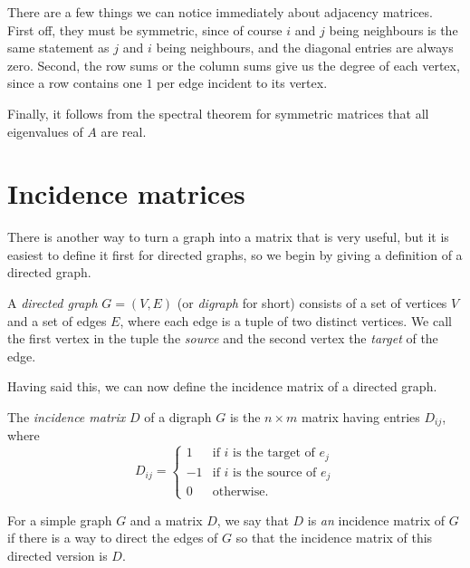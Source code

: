 \documentclass[nobib]{tufte-handout}
\begin{document}
\begin{remark}
    There are a few things we can notice immediately about adjacency matrices. First off, they must be symmetric, since of course $i$ and $j$ being neighbours is the same statement as $j$ and $i$ being neighbours, and the diagonal entries are always zero. Second, the row sums or the column sums give us the degree of each vertex, since a row contains one $1$ per edge incident to its vertex.

    Finally, it follows from the spectral theorem for symmetric matrices that all eigenvalues of $A$ are real.
\end{remark}

\section{Incidence matrices}

There is another way to turn a graph into a matrix that is very useful, but it is easiest to define it first for directed graphs, so we begin by giving a definition of a directed graph.

\begin{definition}
    A \emph{directed graph} $G = (V,E)$ (or \emph{digraph} for short) consists of a set of vertices $V$ and a set of edges $E$, where each edge is a tuple of two distinct vertices. We call the first vertex in the tuple the \emph{source} and the second vertex the \emph{target} of the edge.
\end{definition}

Having said this, we can now define the incidence matrix of a directed graph.

\begin{definition}
    The \emph{incidence matrix} $D$ of a digraph $G$ is the $n\times m$ matrix having entries $D_{ij}$, where
    \begin{equation*}
        D_{ij} = \begin{cases}
            1 &\text{if } i \text{ is the target of } e_j\\
            -1 &\text{if } i \text{ is the source of } e_j\\
            0 &\text{otherwise.}
        \end{cases}
    \end{equation*}

    For a simple graph $G$ and a matrix $D$, we say that $D$ is \emph{an} incidence matrix of $G$ if there is a way to direct the edges of $G$ so that the incidence matrix of this directed version is $D$.
\end{definition}
\end{document}
